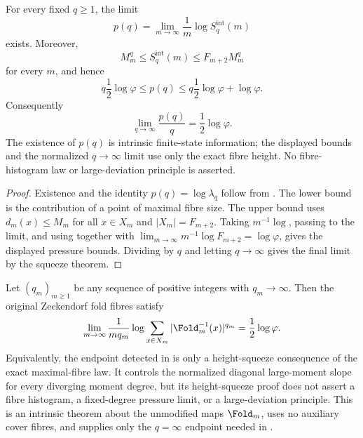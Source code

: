\begin{theorem}
\label{thm:zero-temperature-fold-pressure}
\label{thm:height-squeeze-endpoint}
For every fixed \(q\ge1\), the limit
\[
  p(q)=\lim_{m\to\infty}\frac1m\log S_q^{\mathrm{int}}(m)
\]
exists.  Moreover,
\[
  M_m^q\le S_q^{\mathrm{int}}(m)\le F_{m+2}M_m^q
\]
for every \(m\), and hence
\[
  q\frac12\log\varphi\le p(q)
  \le q\frac12\log\varphi+\log\varphi .
\]
Consequently
\[
  \lim_{q\to\infty}\frac{p(q)}q=\frac12\log\varphi .
\]
The existence of \(p(q)\) is intrinsic finite-state information; the displayed
bounds and the normalized \(q\to\infty\) limit use only the exact fibre height.
No fibre-histogram law or large-deviation principle is asserted.
\end{theorem}

\begin{proof}
Existence and the identity \(p(q)=\log\lambda_q\) follow from
.  The lower bound is the
contribution of a point of maximal fibre size.  The upper
bound uses \(d_m(x)\le M_m\) for all \(x\in X_m\) and
\(|X_m|=F_{m+2}\).  Taking \(m^{-1}\log\), passing to the limit, and using
 together with
\(\lim_{m\to\infty}m^{-1}\log F_{m+2}=\log\varphi\), gives the displayed
pressure bounds.  Dividing by \(q\) and letting \(q\to\infty\) gives the final
limit by the squeeze theorem.
\end{proof}

\begin{theorem}
\label{thm:diagonal-zero-temperature-fold-endpoint}
\label{thm:diagonal-height-endpoint}
Let \((q_m)_{m\ge1}\) be any sequence of positive integers with
\(q_m\to\infty\).  Then the original Zeckendorf fold fibres satisfy
\[
  \lim_{m\to\infty}\frac{1}{m q_m}
  \log\sum_{x\in X_m}|\Fold_m^{-1}(x)|^{q_m}
  ={\frac12}\log\varphi .
\]
Equivalently, the endpoint detected in 
is only a height-squeeze consequence of the exact maximal-fibre law.  It controls
the normalized diagonal large-moment slope for every diverging moment degree, but
its height-squeeze proof does not assert a fibre histogram, a fixed-degree
pressure limit, or a large-deviation principle.
This is an intrinsic theorem about the unmodified maps \(\Fold_m\), uses no
auxiliary cover fibres, and supplies only the \(q=\infty\) endpoint needed in
.
\end{theorem}

